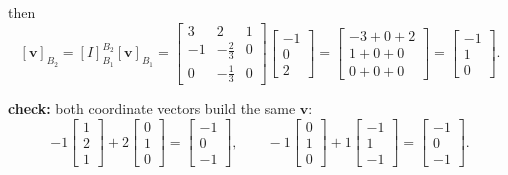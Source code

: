 \documentclass{article}
\begin{document}
then
\[
[\mathbf{v}]_{B_2} = [I]_{B_1}^{B_2}[\mathbf{v}]_{B_1}
= \begin{bmatrix}
3 & 2 & 1 \\
-1 & -\frac{2}{3} & 0 \\
0 & -\frac{1}{3} & 0
\end{bmatrix}
\begin{bmatrix} -1 \\ 0 \\ 2 \end{bmatrix}
= \begin{bmatrix} -3 + 0 + 2 \\ 1 + 0 + 0 \\ 0 + 0 + 0 \end{bmatrix}
= \begin{bmatrix} -1 \\ 1 \\ 0 \end{bmatrix}.
\]

\textbf{check:} both coordinate vectors build the same $\mathbf{v}$:
\[
-1\begin{bmatrix} 1 \\ 2 \\ 1 \end{bmatrix}
+ 2\begin{bmatrix} 0 \\ 1 \\ 0 \end{bmatrix}
= \begin{bmatrix} -1 \\ 0 \\ -1 \end{bmatrix},
\qquad
-1\begin{bmatrix} 0 \\ 1 \\ 0 \end{bmatrix}
+ 1\begin{bmatrix} -1 \\ 1 \\ -1 \end{bmatrix}
= \begin{bmatrix} -1 \\ 0 \\ -1 \end{bmatrix}.
\]
\end{document}
